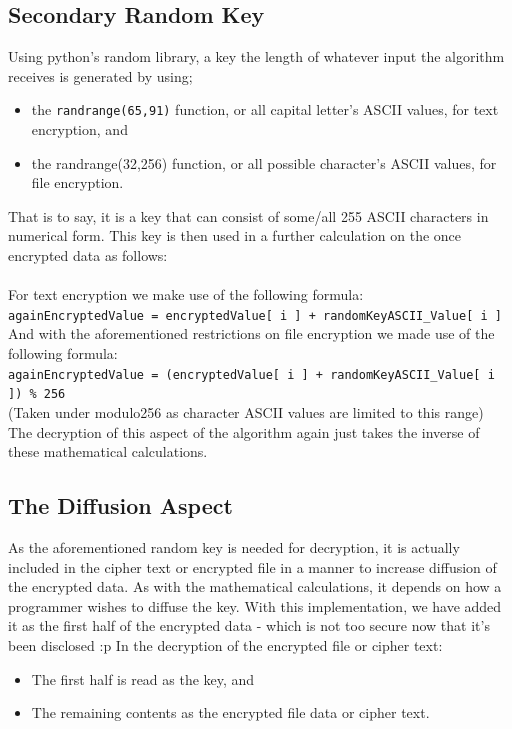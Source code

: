 \documentclass[a4paper, 12pt, titlepage]{report}
\begin{document}
\subsection{Secondary Random Key}
Using python's random library, a key the length of whatever input the algorithm receives is generated by using;
\begin{itemize}
\item the \texttt{randrange(65,91)} function, or all capital letter's ASCII values, for text encryption, and
\item the randrange(32,256) function, or all possible character's ASCII values, for file encryption.
\end{itemize}
That is to say, it is a key that can consist of some/all 255 ASCII characters in numerical form. This key is then used in a further calculation on the once encrypted data as follows:\\\\
For text encryption we make use of the following formula:\\
\texttt{againEncryptedValue = encryptedValue[ i ] + randomKeyASCII\_Value[ i ]}\\
And with the aforementioned restrictions on file encryption we made use of the following formula:\\
\texttt{againEncryptedValue = (encryptedValue[ i ] + randomKeyASCII\_Value[ i ]) \% 256}\\
(Taken under modulo256 as character ASCII values are limited to this range)\\
The decryption of this aspect of the algorithm again just takes the inverse of these mathematical calculations.
\subsection{The Diffusion Aspect}
As the aforementioned random key is needed for decryption, it is actually included in the cipher text or encrypted file in a manner to increase diffusion of the encrypted data. As with the mathematical calculations, it depends on how a programmer wishes to diffuse the key. With this implementation, we have added it as the first half of the encrypted data - which is not too secure now that it's been disclosed :p
In the decryption of the encrypted file or cipher text:
\begin{itemize}
\item The first half is read as the key, and
\item The remaining contents as the encrypted file data or cipher text.
\end{itemize}
\end{document}
